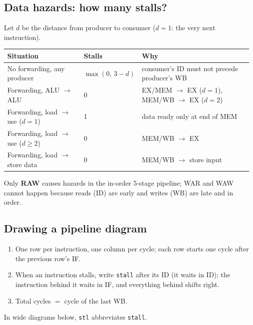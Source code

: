 \documentclass[11pt]{article}
\begin{document}
\subsection{Data hazards: how many stalls?}
Let $d$ be the distance from producer to consumer ($d=1$: the very next
instruction).
\begin{center}
\begin{tabular}{@{}p{4.6cm}lp{6.2cm}@{}}
\toprule
Situation & Stalls & Why \\
\midrule
No forwarding, any producer & $\max(0,\,3-d)$ & consumer's ID must not precede producer's WB \\
Forwarding, ALU $\to$ ALU & 0 & EX/MEM $\to$ EX ($d=1$), MEM/WB $\to$ EX ($d=2$) \\
Forwarding, load $\to$ use ($d=1$) & 1 & data ready only at end of MEM \\
Forwarding, load $\to$ use ($d\ge2$) & 0 & MEM/WB $\to$ EX \\
Forwarding, load $\to$ store data & 0 & MEM/WB $\to$ store input \\
\bottomrule
\end{tabular}
\end{center}
Only \textbf{RAW} causes hazards in the in-order 5-stage pipeline; WAR and
WAW cannot happen because reads (ID) are early and writes (WB) are late and
in order.

\subsection{Drawing a pipeline diagram}
\begin{enumerate}[leftmargin=*]
  \item One row per instruction, one column per cycle; each row starts one
  cycle after the previous row's IF.
  \item When an instruction stalls, write \texttt{stall} after its ID (it
  waits in ID); the instruction behind it waits in IF, and everything behind
  shifts right.
  \item Total cycles $=$ cycle of the last WB.
\end{enumerate}
In wide diagrams below, \texttt{stl} abbreviates \texttt{stall}.
\end{document}
